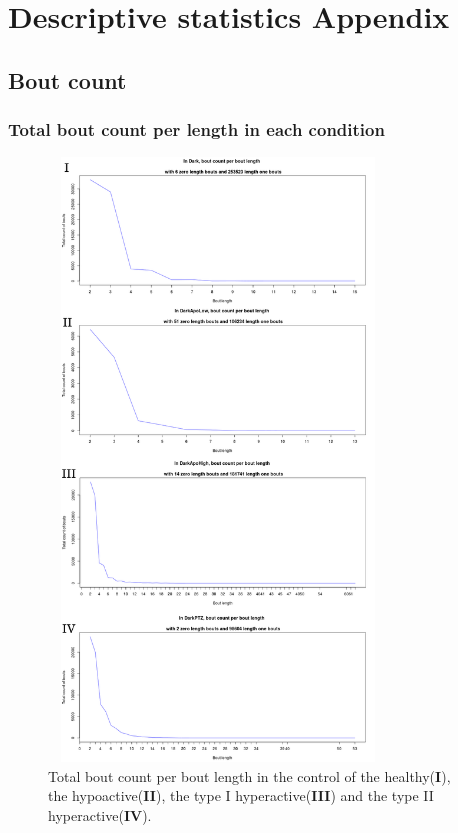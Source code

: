 \documentclass[a4paper,12pt]{article}
\begin{document}
\newpage
\section{Descriptive statistics Appendix}
\subsection{Bout count}

\subsubsection{Total bout count per length in each condition}

\begin{figure}[h!]
\begin{center}
\includegraphics[width=9cm,height=16cm]{TotalBoutCount.png}
\caption{Total bout count per bout length in the control of the healthy(\textbf{I}), the hypoactive(\textbf{II}), the type I hyperactive(\textbf{III}) and the type II hyperactive(\textbf{IV}).}
\end{center}
\end{figure}
\end{document}
